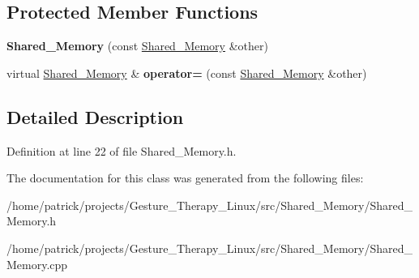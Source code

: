 \subsection*{Protected Member Functions}
\begin{DoxyCompactItemize}
\item 
\mbox{\label{class_shared___memory_ad9f7e3225b081f872874c2f0d29e2232}} 
{\bfseries Shared\+\_\+\+Memory} (const \hyperlink{class_shared___memory}{Shared\+\_\+\+Memory} \&other)
\item 
\mbox{\label{class_shared___memory_a1f435a59e197184d1f368ed461c68796}} 
virtual \hyperlink{class_shared___memory}{Shared\+\_\+\+Memory} \& {\bfseries operator=} (const \hyperlink{class_shared___memory}{Shared\+\_\+\+Memory} \&other)
\end{DoxyCompactItemize}


\subsection{Detailed Description}


Definition at line 22 of file Shared\+\_\+\+Memory.\+h.



The documentation for this class was generated from the following files\+:\begin{DoxyCompactItemize}
\item 
/home/patrick/projects/\+Gesture\+\_\+\+Therapy\+\_\+\+Linux/src/\+Shared\+\_\+\+Memory/Shared\+\_\+\+Memory.\+h\item 
/home/patrick/projects/\+Gesture\+\_\+\+Therapy\+\_\+\+Linux/src/\+Shared\+\_\+\+Memory/Shared\+\_\+\+Memory.\+cpp\end{DoxyCompactItemize}
